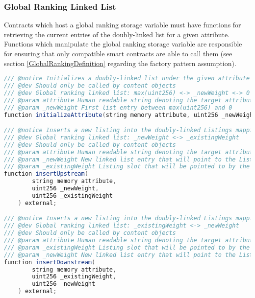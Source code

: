 \subsubsection{Global Ranking Linked List}
\label{GlobalRankingInterface}

Contracts which host a global ranking storage variable must have functions for retrieving the current entries of the doubly-linked list for a given attribute. Functions which manipulate the global ranking storage variable are responsible for ensuring that only compatible smart contracts are able to call them (see section \ref{GlobalRankingDefinition} regarding the factory pattern assumption).

\begin{lstlisting}[language=Java, caption=A minimal interface for reading and writing to the global ranking namespace.]
/// @notice Initializes a doubly-linked list under the given attribute
/// @dev Should only be called by content objects
/// @dev Global ranking linked list: max(uint256) <-> _newWeight <-> 0
/// @param attribute Human readable string denoting the target attribute to insert into global ranking
/// @param _newWeight First list entry between max(uint256) and 0
function initializeAttribute(string memory attribute, uint256 _newWeight) external;

/// @notice Inserts a new listing into the doubly-linked Listings mapping
/// @dev Global ranking linked list: _newWeight <-> _existingWeight 
/// @dev Should only be called by content objects
/// @param attribute Human readable string denoting the target attribute to stake
/// @param _newWeight New linked list entry that will point to the Listing at _existingWeight 
/// @param _existingWeight Listing slot that will be pointed to by the new Listing at _newWeight 
function insertUpstream(
        string memory attribute, 
        uint256 _newWeight, 
        uint256 _existingWeight
    ) external;

/// @notice Inserts a new listing into the doubly-linked Listings mapping
/// @dev Global ranking linked list: _existingWeight <-> _newWeight
/// @dev Should only be called by content objects
/// @param attribute Human readable string denoting the target attribute to stake
/// @param _existingWeight Listing slot that will be pointed to by the new Listing at _newWeight  
/// @param _newWeight New linked list entry that will point to the Listing at _existingWeight 
function insertDownstream(
        string memory attribute, 
        uint256 _existingWeight, 
        uint256 _newWeight
    ) external;


\end{lstlisting}
